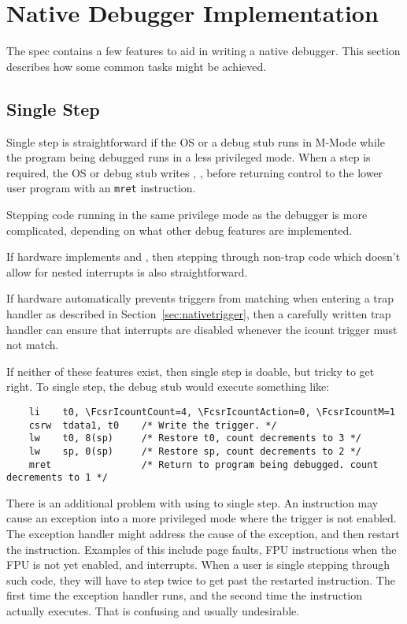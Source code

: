 \section{Native Debugger Implementation}

The spec contains a few features to aid in writing a native debugger. This
section describes how some common tasks might be achieved.

\subsection{Single Step} \label{nativestep}

Single step is straightforward if the OS or a debug stub runs in M-Mode while the
program being debugged runs in a less privileged mode. When a step is required,
the OS or debug stub writes , ,
 before returning control to the lower user program with an
{\tt mret} instruction.

Stepping code running in the same privilege mode as the debugger is more
complicated, depending on what other debug features are implemented.

If hardware implements \FcsrTcontrolMpte and \FcsrTcontrolMte, then stepping
through non-trap code which doesn't allow for nested interrupts is also
straightforward.

If hardware automatically prevents  triggers from
matching when entering a trap handler as described in
Section~\ref{sec:nativetrigger}, then a carefully written trap handler can
ensure that interrupts are disabled whenever the icount trigger must not match.

If neither of these features exist, then single step is doable, but tricky to
get right. To single step, the debug stub would execute something like:
\begin{verbatim}
    li    t0, \FcsrIcountCount=4, \FcsrIcountAction=0, \FcsrIcountM=1
    csrw  tdata1, t0    /* Write the trigger. */
    lw    t0, 8(sp)     /* Restore t0, count decrements to 3 */
    lw    sp, 0(sp)     /* Restore sp, count decrements to 2 */
    mret                /* Return to program being debugged. count decrements to 1 */
\end{verbatim}

There is an additional problem with using \RcsrIcount to single step.  An
instruction may cause an exception into a more privileged mode where the trigger
is not enabled.  The exception handler might address the cause of the exception,
and then restart the instruction.  Examples of this include page faults, FPU
instructions when the FPU is not yet enabled, and interrupts.
When a user is single stepping
through such code, they will have to step twice to get past the restarted
instruction. The first time the exception handler runs, and the second time the
instruction actually executes. That is confusing and usually undesirable.

